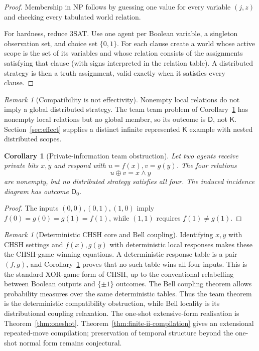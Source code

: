 \documentclass[11pt]{article}
\theoremstyle{plain}
\newtheorem{corollary}[theorem]{Corollary}
\theoremstyle{definition}
\theoremstyle{remark}
\newtheorem{remark}[theorem]{Remark}
\begin{document}
\begin{proof}
Membership in NP follows by guessing one value for every variable $(j,z)$ and
checking every tabulated world relation.

For hardness, reduce 3SAT. Use one agent per Boolean variable, a singleton
observation set, and choice set $\{0,1\}$. For each clause create a world whose
active scope is the set of its variables and whose relation consists of the
assignments satisfying that clause (with signs interpreted in the
relation table). A distributed strategy is then a truth assignment, valid
exactly when it satisfies every clause.
\end{proof}

\begin{remark}[Compatibility is not effectivity]
Nonempty local relations do not imply a global distributed strategy. The team
team problem of Corollary~\ref{cor:team-decision} has nonempty local relations but no global member, so its outcome
is $\mathsf D$, not $\mathsf K$. Section~\ref{sec:effect} supplies a distinct infinite represented
$\mathsf K$ example with nested distributed scopes.
\end{remark}



\begin{corollary}[Private-information team obstruction]
\label{cor:team-decision}
Let two agents receive private bits $x,y$ and respond with
$u=f(x),v=g(y)$. The four relations
\[
u\oplus v=x\wedge y
\]
are nonempty, but no distributed strategy satisfies all four. The induced
incidence diagram has outcome $\mathsf D_0$.
\end{corollary}

\begin{proof}
The inputs $(0,0),(0,1),(1,0)$ imply
$f(0)=g(0)=g(1)=f(1)$, while $(1,1)$ requires $f(1)\ne g(1)$.
\end{proof}

\begin{remark}[Deterministic CHSH core and Bell coupling]
Identifying $x,y$ with CHSH settings and $f(x),g(y)$ with deterministic local
responses makes these the CHSH-game winning equations. A deterministic response
table is a pair $(f,g)$, and Corollary~\ref{cor:team-decision} proves that no such
table wins all four inputs. This is the standard XOR-game form of CHSH, up to the conventional relabelling
between Boolean outputs and $\{\pm1\}$ outcomes. The Bell coupling theorem allows probability measures over the same deterministic tables. Thus the team theorem is the
deterministic compatibility obstruction, while Bell locality is its
distributional coupling relaxation. The one-shot extensive-form realisation is
Theorem~\ref{thm:oneshot}. Theorem~\ref{thm:finite-ii-compilation} gives
an extensional repeated-move compilation; preservation of temporal structure
beyond the one-shot normal form remains conjectural.
\end{remark}
\end{document}
